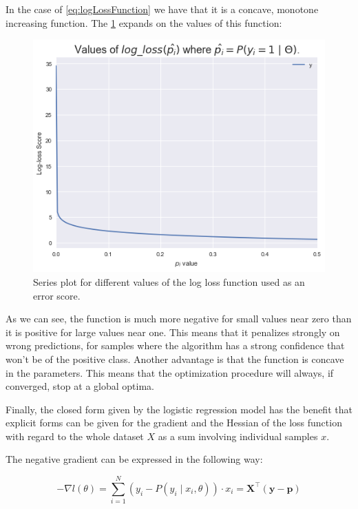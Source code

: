 In the case of \cref{eq:logLossFunction} we have that it is a concave, monotone increasing function. The \cref{figure-logLossValues} expands on the values of this function:

\begin{figure}[h!]
\begin{center}
\includegraphics[width=0.7\columnwidth]{figures/logloss/figure-logLossValues.png}
\caption{ Series plot for different values of the log loss function used as an error score.}
\label{figure-logLossValues}
\end{center}
\end{figure}

As we can see, the function is much more negative for small values near zero than it is positive for large values near one. This means that it penalizes strongly on wrong predictions, for samples where the algorithm has a strong confidence that won't be of the positive class. Another advantage is that the function is concave in the parameters. This means that the optimization procedure will always, if converged, stop at a global optima.

Finally, the closed form given by the logistic regression model has the benefit that explicit forms can be given for the gradient and the Hessian of the loss function with regard to the whole dataset $X$ as a sum involving individual samples $x$.

The negative gradient can be expressed in the following way: %

\begin{equation}\label{eq:logitHessian1}
- \nabla l(\theta) = \sum_{i=1}^N (y_i - P(y_i \mid x_i,\theta))\cdot x_i = \textbf{X}^{\intercal}(\textbf{y}-\textbf{p})
\end{equation}

